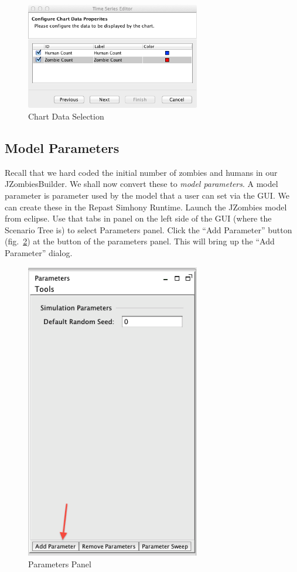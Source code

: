\documentclass[11pt]{amsart}
\begin{document}
\begin{figure}[h]
\begin{center}
\vspace{.2in}
\centerline {
\includegraphics[width=3in]{GettingStartedImages/chart_data.png}
}
\caption{Chart Data Selection}
\label{fig:chart1}
\end{center}
\end{figure}


\subsection{Model Parameters}
Recall that we hard coded the initial number of zombies and humans in our JZombiesBuilder. We shall now convert these to \textit{model parameters}. A model parameter is parameter used by the model that a user can set via the GUI. We can create these in the Repast Simhony Runtime. Launch the JZombies model from eclipse. Use that tabs in panel on the left side of the GUI (where the Scenario Tree is) to select Parameters panel. Click the ``Add Parameter''  button (fig.~\ref{fig:params1}) at the button of the parameters panel. This will bring up the ``Add Parameter'' dialog.

\begin{figure}[h]
\begin{center}
\vspace{.2in}
\centerline {
\includegraphics[width=3in]{GettingStartedImages/params1.png}
}
\caption{Parameters Panel}
\label{fig:params1}
\end{center}
\end{figure}
\end{document}
